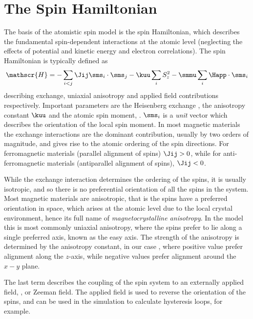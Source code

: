 \section*{The Spin Hamiltonian}
The basis of the atomistic spin model is the spin Hamiltonian, which describes the fundamental spin-dependent interactions at the atomic level (neglecting the effects of potential and kinetic energy and electron correlations). The spin Hamiltonian is typically defined as
\begin{equation*}
\mathscr{H} = - \sum_{i<j} \Jij \sms_i \cdot \sms_j - \kuu \sum_{i} S_z^2 - \smmu \sum_i \Happ \cdot \sms_i
\end{equation*}
describing exchange, uniaxial anisotropy and applied field contributions respectively. Important parameters are the Heisenberg exchange \Jij, the anisotropy constant $\kuu$ and the atomic spin moment, \smmu. $\sms_i$ is a \textit{unit} vector which describes the orientation of the local spin moment. In most magnetic materials the exchange interactions are the dominant contribution, usually by two orders of magnitude, and gives rise to the atomic ordering of the spin directions. For ferromagnetic materials (parallel alignment of spins) $\Jij > 0$, while for anti-ferromagnetic materials (antiparallel alignment of spins), $\Jij < 0$.

While the exchange interaction determines the ordering of the spins, it is usually isotropic, and so there is no preferential orientation of all the spins in the system. Most magnetic materials are anisotropic, that is the spins have a preferred orientation in space, which arises at the atomic level due to the local crystal environment, hence its full name of \textit{magnetocrystalline anisotropy}. In the model this is most commonly uniaxial anisotropy, where the spins prefer to lie along a single preferred axis, known as the easy axis. The strength of the anisotropy is determined by the anisotropy constant, in our case \kuu, where positive value prefer alignment along the $z$-axis, while negative values prefer alignment around the $x-y$ plane.

The last term describes the coupling of the spin system to an externally applied field, \Happ, or Zeeman field. The applied field is used to reverse the orientation of the spins, and can be used in the simulation to calculate hysteresis loops, for example.

